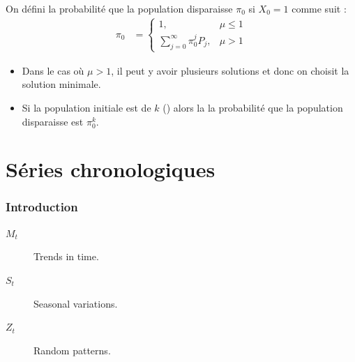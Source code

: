 \documentclass[french]{article}
\begin{document}
\begin{multicols*}{2}
\begin{center}
\end{center}



On défini la probabilité que la population disparaisse $\pi_{0}$ si $X_{0} = 1$ comme suit : 
\begin{align*}
	\pi_{0}
	&=	\begin{cases}
		1,	&	\mu \leq 1	\\
		\sum_{j = 0}^{\infty}\pi_{0}^{j}P_{j},	&	\mu > 1
	\end{cases}
\end{align*}
\begin{itemize}
	\item	Dans le cas où $\mu > 1$, il peut y avoir plusieurs solutions et donc on choisit la solution minimale.
	\item	Si la population initiale est de $k$ () alors la la probabilité que la population disparaisse est $\pi_{0}^{k}$.
\end{itemize}



\newpage	
\part{Séries chronologiques}\label{chapt:seriesChrono}
\section{Introduction}
\begin{distributions}[Notation]
\begin{description}
	\item[$M_{t}$]	Trends in time.
	\item[$S_{t}$]	Seasonal variations.
	\item[$Z_{t}$]	Random patterns.
\end{description}
\end{distributions}


\end{multicols*}
\end{document}
